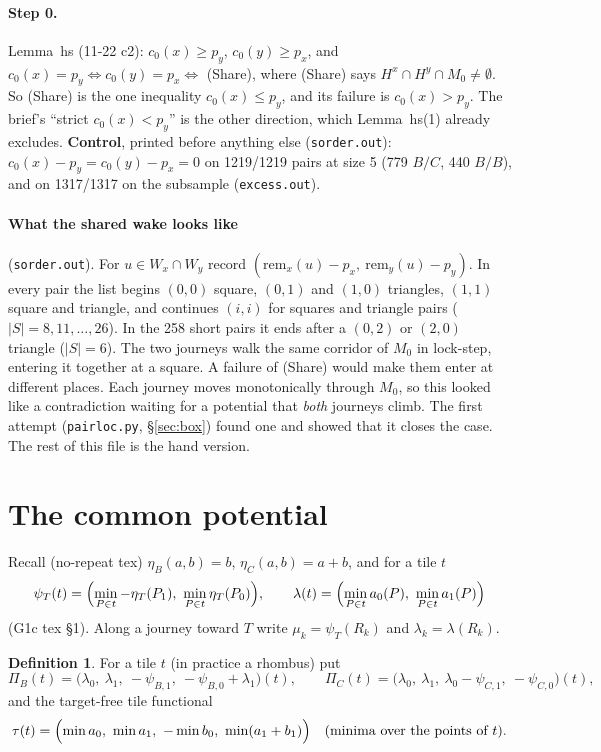 \documentclass[11pt]{article}
\theoremstyle{definition}\newtheorem{definition}[theorem]{Definition}\newtheorem{remark}[theorem]{Remark}
\begin{document}
\paragraph{Step 0.} Lemma~hs (11-22 c2): $c_0(x)\ge p_y$, $c_0(y)\ge p_x$, and $c_0(x)=p_y\iff c_0(y)=p_x\iff$ (Share), where (Share) says $H^x\cap H^y\cap M_0\neq\emptyset$. So (Share) is the one inequality $c_0(x)\le p_y$, and its failure is $c_0(x)>p_y$. The brief's ``strict $c_0(x)<p_y$'' is the other direction, which Lemma~hs(1) already excludes. \textbf{Control}, printed before anything else (\texttt{sorder.out}): $c_0(x)-p_y=c_0(y)-p_x=0$ on 1219/1219 pairs at size 5 (779 $B/C$, 440 $B/B$), and on 1317/1317 on the subsample (\texttt{excess.out}).

\paragraph{What the shared wake looks like} (\texttt{sorder.out}). For $u\in W_x\cap W_y$ record $(\mathrm{rem}_x(u)-p_x,\ \mathrm{rem}_y(u)-p_y)$. In every pair the list begins $(0,0)$ square, $(0,1)$ and $(1,0)$ triangles, $(1,1)$ square and triangle, and continues $(i,i)$ for squares and triangle pairs ($|S|=8,11,\dots,26$). In the 258 short pairs it ends after a $(0,2)$ or $(2,0)$ triangle ($|S|=6$). The two journeys walk the same corridor of $M_0$ in lock-step, entering it together at a square. A failure of (Share) would make them enter at different places. Each journey moves monotonically through $M_0$, so this looked like a contradiction waiting for a potential that \emph{both} journeys climb. The first attempt (\texttt{pairloc.py}, \S\ref{sec:box}) found one and showed that it closes the case. The rest of this file is the hand version.

\section{The common potential}\label{sec:pot}
Recall (no-repeat tex) $\eta_B(a,b)=b$, $\eta_C(a,b)=a+b$, and for a tile $t$
\[\psi_T(t)=\Bigl(\min_{P\in t}-\eta_T(P_1),\ \min_{P\in t}\eta_T(P_0)\Bigr),\qquad \lambda(t)=\Bigl(\min_{P\in t}a_0(P),\ \min_{P\in t}a_1(P)\Bigr)\]
(G1c tex \S1). Along a journey toward $T$ write $\mu_k=\psi_T(R_k)$ and $\lambda_k=\lambda(R_k)$.

\begin{definition}
For a tile $t$ (in practice a rhombus) put
\[\Pi_B(t)=\bigl(\lambda_0,\ \lambda_1,\ -\psi_{B,1},\ -\psi_{B,0}+\lambda_1\bigr)(t),\qquad \Pi_C(t)=\bigl(\lambda_0,\ \lambda_1,\ \lambda_0-\psi_{C,1},\ -\psi_{C,0}\bigr)(t),\]
and the target-free tile functional
\[\tau(t)=\Bigl(\min a_0,\ \min a_1,\ -\min b_0,\ \min(a_1+b_1)\Bigr)\quad(\text{minima over the points of }t).\]
\end{definition}
\end{document}
